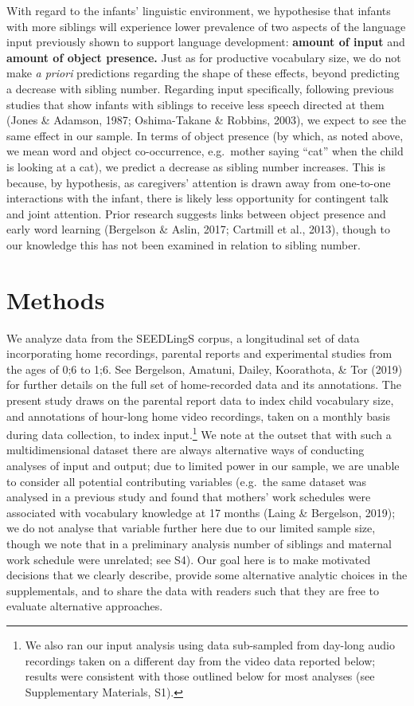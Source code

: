 \documentclass[
  man,floatsintext]{apa6}
\begin{document}
With regard to the infants' linguistic environment, we hypothesise that infants with more siblings will experience lower prevalence of two aspects of the language input previously shown to support language development: \textbf{amount of input} and \textbf{amount of object presence.} Just as for productive vocabulary size, we do not make \emph{a priori} predictions regarding the shape of these effects, beyond predicting a decrease with sibling number. Regarding input specifically, following previous studies that show infants with siblings to receive less speech directed at them (Jones \& Adamson, 1987; Oshima-Takane \& Robbins, 2003), we expect to see the same effect in our sample. In terms of object presence (by which, as noted above, we mean word and object co-occurrence, e.g.~mother saying ``cat'' when the child is looking at a cat), we predict a decrease as sibling number increases. This is because, by hypothesis, as caregivers' attention is drawn away from one-to-one interactions with the infant, there is likely less opportunity for contingent talk and joint attention. Prior research suggests links between object presence and early word learning (Bergelson \& Aslin, 2017; Cartmill et al., 2013), though to our knowledge this has not been examined in relation to sibling number.

\hypertarget{methods}{%
\section{Methods}\label{methods}}

We analyze data from the SEEDLingS corpus, a longitudinal set of data incorporating home recordings, parental reports and experimental studies from the ages of 0;6 to 1;6. See Bergelson, Amatuni, Dailey, Koorathota, \& Tor (2019) for further details on the full set of home-recorded data and its annotations. The present study draws on the parental report data to index child vocabulary size, and annotations of hour-long home video recordings, taken on a monthly basis during data collection, to index input.\footnote{We also ran our input analysis using data sub-sampled from day-long audio recordings taken on a different day from the video data reported below; results were consistent with those outlined below for most analyses (see Supplementary Materials, S1).} We note at the outset that with such a multidimensional dataset there are always alternative ways of conducting analyses of input and output; due to limited power in our sample, we are unable to consider all potential contributing variables (e.g.~the same dataset was analysed in a previous study and found that mothers' work schedules were associated with vocabulary knowledge at 17 months (Laing \& Bergelson, 2019); we do not analyse that variable further here due to our limited sample size, though we note that in a preliminary analysis number of siblings and maternal work schedule were unrelated; see S4). Our goal here is to make motivated decisions that we clearly describe, provide some alternative analytic choices in the supplementals, and to share the data with readers such that they are free to evaluate alternative approaches.
\end{document}
